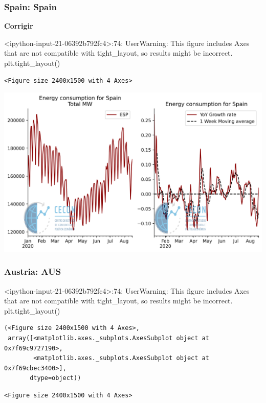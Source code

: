\documentclass[11pt]{article}
\begin{document}
\subsubsection{Spain: Spain}
\label{sec:orgd1ad82d}

\textbf{Corrigir}

<ipython-input-21-06392b792fc4>:74: UserWarning: This figure includes Axes that are not compatible with tight\_layout, so results might be incorrect.
  plt.tight\_layout()

\begin{verbatim}
<Figure size 2400x1500 with 4 Axes>
\end{verbatim}


\begin{center}
\includegraphics[width=.9\linewidth]{obipy-resources/62e383af79e91b63c7fc98dd7fb55b3c3ececcb9/aa615addfd95d863842bc30c5c6c024b67813166.png}
\end{center}

\subsubsection{Austria: AUS}
\label{sec:org6b94274}

<ipython-input-21-06392b792fc4>:74: UserWarning: This figure includes Axes that are not compatible with tight\_layout, so results might be incorrect.
  plt.tight\_layout()

\begin{verbatim}
(<Figure size 2400x1500 with 4 Axes>,
 array([<matplotlib.axes._subplots.AxesSubplot object at 0x7f69c9727190>,
        <matplotlib.axes._subplots.AxesSubplot object at 0x7f69cbec3400>],
       dtype=object))
\end{verbatim}


\begin{verbatim}
<Figure size 2400x1500 with 4 Axes>
\end{verbatim}
\end{document}
